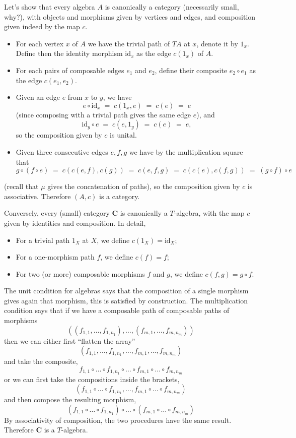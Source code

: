 \documentclass[12pt,oneside]{scrbook}
\numberwithin{equation}{section}
\theoremstyle{plain}
\theoremstyle{definition}
\newcommand{\cat}[1]{{\mathbf{#1}}} %
\DeclareMathOperator{\1}{\mathbbm{1}}
\DeclareMathOperator{\2}{\mathbbm{2}}
\newcommand{\id}{\mathrm{id}} %
\begin{document}
 Let's show that every algebra $A$ is canonically a category (necessarily small, why?), with objects and morphisms given by vertices and edges, and composition given indeed by the map $c$. 
 \begin{itemize}
  \item For each vertex $x$ of $A$ we have the trivial path of $TA$ at $x$, denote it by $1_x$. Define then the identity morphism $\id_x$ as the edge $c(1_x)$ of $A$. 
  \item For each pairs of composable edges $e_1$ and $e_2$, define their composite $e_2\circ e_1$ as the edge $c(e_1,e_2)$. 
  \item Given an edge $e$ from $x$ to $y$, we have
  $$
  e \circ \id_x \;=\; c(1_x,e) \;=\; c(e) \;=\;e
  $$
  (since composing with a trivial path gives the same edge $e$), and 
  $$
  \id_y\circ e \;=\; c(e,1_y) \;=\; c(e) \;=\; e ,
  $$
  so the composition given by $c$ is unital.
  \item Given three consecutive edges $e,f,g$ we have by the multiplication square that
  $$
  g\circ (f\circ e) \;=\; c(c(e,f),c(g)) \;=\; c(e,f,g) \;=\; c(c(e),c(f,g)) \;=\; (g\circ f)\circ e 
  $$
 \end{itemize}
 (recall that $\mu$ gives the concatenation of paths),
 so the composition given by $c$ is associative.
 Therefore $(A,c)$ is a category.

 Conversely, every (small) category $\cat{C}$ is canonically a $T$-algebra, with the map $c$ given by identities and composition. In detail,
 \begin{itemize}
  \item For a trivial path $1_X$ at $X$, we define $c(1_X)=\id_X$;
  \item For a one-morphism path $f$, we define $c(f)=f$;
  \item For two (or more) composable morphisms $f$ and $g$, we define $c(f,g)=g\circ f$. 
 \end{itemize}
 The unit condition for algebras says that the composition of a single morphism gives again that morphism, this is satisfied by construction. The multiplication condition says that if we have a composable path of composable paths of morphisms 
 $$
 ((f_{1,1},\dots,f_{1,n_1}),\dots,(f_{m,1},\dots,f_{m,n_m}))
 $$
 then we can either first ``flatten the array'' 
 $$
 (f_{1,1},\dots,f_{1,n_1},\dots,f_{m,1},\dots,f_{m,n_m})
 $$
 and take the composite,
 $$
 f_{1,1}\circ\dots\circ f_{1,n_1}\circ\dots\circ f_{m,1}\circ\dots\circ f_{m,n_m}
 $$
 or we can first take the compositions inside the brackets,
 $$
 (f_{1,1}\circ\dots\circ f_{1,n_1},\dots,f_{m,1}\circ\dots\circ f_{m,n_m})
 $$
 and then compose the resulting morphism,
 $$
 (f_{1,1}\circ\dots\circ f_{1,n_1})\circ\dots\circ (f_{m,1}\circ\dots\circ f_{m,n_m})
 $$
 By associativity of composition, the two procedures have the same result. Therefore $\cat{C}$ is a $T$-algebra.
 
\end{document}
